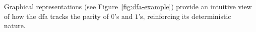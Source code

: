 \begin{observation}
    Graphical representations (see Figure~\ref{fig:dfa-example}) provide an intuitive view of how the \gls{dfa} tracks the parity of \(0\)'s and \(1\)'s, reinforcing its deterministic nature.
\end{observation}